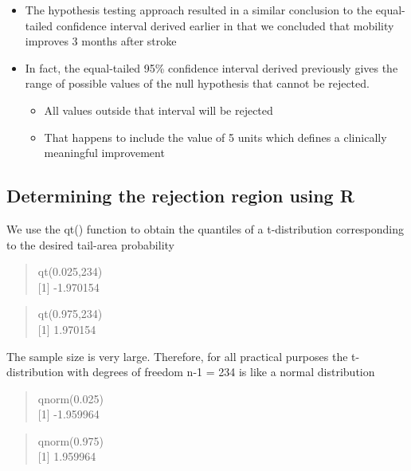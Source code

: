 \documentclass[
]{book}
\providecommand{\tightlist}{%
  \setlength{\itemsep}{0pt}\setlength{\parskip}{0pt}}
\begin{document}
\begin{itemize}
\tightlist
\item
  The hypothesis testing approach resulted in a similar conclusion to the equal-tailed confidence interval derived earlier in that we concluded that mobility improves 3 months after stroke
\item
  In fact, the equal-tailed 95\% confidence interval derived previously gives the range of possible values of the null hypothesis that cannot be rejected.

  \begin{itemize}
  \tightlist
  \item
    All values outside that interval will be rejected
  \item
    That happens to include the value of 5 units which defines a clinically meaningful improvement
  \end{itemize}
\end{itemize}

\hypertarget{determining-the-rejection-region-using-r}{%
\subsection{Determining the rejection region using R}\label{determining-the-rejection-region-using-r}}

We use the qt() function to obtain the quantiles of a t-distribution corresponding to the desired tail-area probability

\begin{quote}
qt(0.025,234)\\
{[}1{]} -1.970154
\end{quote}

\begin{quote}
qt(0.975,234)\\
{[}1{]} 1.970154
\end{quote}

The sample size is very large. Therefore, for all practical purposes the t-distribution with degrees of freedom n-1 = 234 is like a normal distribution

\begin{quote}
qnorm(0.025)\\
{[}1{]} -1.959964
\end{quote}

\begin{quote}
qnorm(0.975)\\
{[}1{]} 1.959964
\end{quote}
\end{document}
